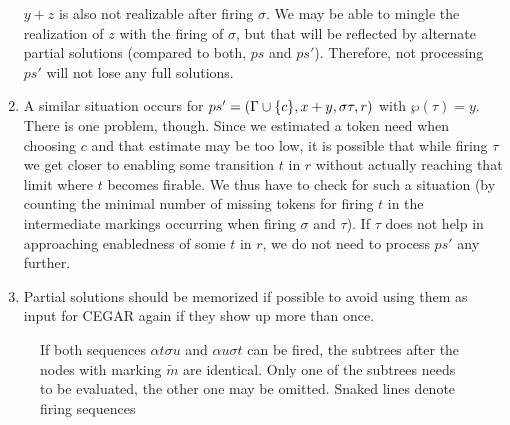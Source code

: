 \documentclass{LMCS}
\newcommand{\parikh}{\wp}
\begin{document}
\begin{enumerate}[(1)]
$y+z$ is also not realizable after firing $\sigma$. We may be able to
mingle the realization of $z$ with the firing of $\sigma$, but that will be reflected by alternate partial solutions
(compared to both, $ps$ and $ps'$). Therefore, not processing $ps'$ will not lose any full solutions.
\item A similar situation occurs for $ps'=({\Gamma}\cup\{c\},x+y,\sigma\tau,r)$ with $\parikh(\tau)=y$. There is one problem,
though. Since we estimated a token need when choosing $c$ and that estimate may be too low, it is possible that while
firing $\tau$ we get closer to enabling some transition $t$ in $r$ without actually reaching that limit where $t$
becomes firable. We thus have to check for such a situation (by counting the minimal number of missing tokens for
firing $t$ in the intermediate markings occurring when firing $\sigma$ and $\tau$). If $\tau$ does not help in
approaching enabledness of some $t$ in $r$, we do not need to process $ps'$ any further.
\item Partial solutions should be memorized if possible to avoid using them as input for CEGAR again if they show up more than once.
\end{enumerate}

\begin{figure}[tb]
\centering
{}
\caption{\label{f.tree}If both sequences $\alpha t\sigma u$ and $\alpha u\sigma t$ can be fired, the subtrees
after the nodes with marking $\tilde{m}$ are identical. Only one of the subtrees needs to be evaluated, the other one
may be omitted. Snaked lines denote firing sequences}
\end{figure}
\end{document}
